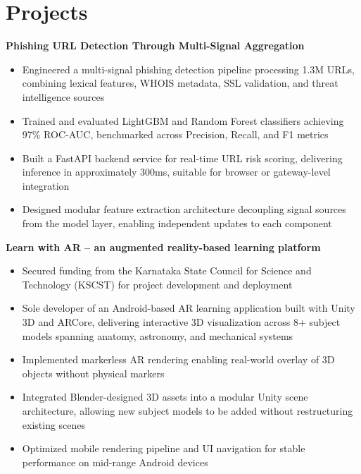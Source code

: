 \documentclass[10pt, a4paper]{article}
\newcommand{\projectheader}[1]{%
  \noindent\textbf{#1}
}
\begin{document}
\section{Projects}

\projectheader{Phishing URL Detection Through Multi-Signal Aggregation}
\begin{itemize}
    \item Engineered a multi-signal phishing detection pipeline processing 1.3M URLs, combining lexical features, WHOIS metadata, SSL validation, and threat intelligence sources
    \item Trained and evaluated LightGBM and Random Forest classifiers achieving 97\% ROC-AUC, benchmarked across Precision, Recall, and F1 metrics
    \item Built a FastAPI backend service for real-time URL risk scoring, delivering inference in approximately 300ms, suitable for browser or gateway-level integration
    \item Designed modular feature extraction architecture decoupling signal sources from the model layer, enabling independent updates to each component
\end{itemize}

\vspace{4pt}

\projectheader{Learn with AR -- an augmented reality-based learning platform}
\begin{itemize}
    \item Secured funding from the Karnataka State Council for Science and Technology (KSCST) for project development and deployment
    \item Sole developer of an Android-based AR learning application built with Unity 3D and ARCore, delivering interactive 3D visualization across 8+ subject models spanning anatomy, astronomy, and mechanical systems
    \item Implemented markerless AR rendering enabling real-world overlay of 3D objects without physical markers
    \item Integrated Blender-designed 3D assets into a modular Unity scene architecture, allowing new subject models to be added without restructuring existing scenes
    \item Optimized mobile rendering pipeline and UI navigation for stable performance on mid-range Android devices
\end{itemize}
\end{document}
